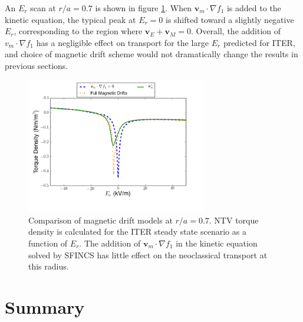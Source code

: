 \documentclass{article}
\numberwithin{figure}{section}
\numberwithin{equation}{section}
\begin{document}
An $E_r$ scan at $r/a = 0.7$ is shown in figure \ref{fig:driftschemes}. When $\bm{v}_m \cdot \nabla f_1$ is added to the kinetic equation, the typical peak at $E_r = 0$ is shifted toward a slightly negative $E_r$, corresponding to the region where $\bm{v}_E + \bm{v}_M = 0$. Overall, the addition of $v_m \cdot \nabla f_1$ has a negligible effect on transport for the large $E_r$ predicted for ITER, and choice of magnetic drift scheme would not dramatically change the results in previous sections.  

\begin{figure}[h!]
\centering
\includegraphics[width=0.7\textwidth]{mdscomparison.png}
\caption{\label{fig:driftschemes} Comparison of magnetic drift models at $r/a = 0.7$. NTV torque density is calculated for the ITER steady state scenario as a function of $E_r$. The addition of $\bm{v}_m \cdot \nabla f_1$ in the kinetic equation solved by SFINCS has little effect on the neoclassical transport at this radius. }
\end{figure}

\FloatBarrier

\section{Summary}\label{summary}
\end{document}
